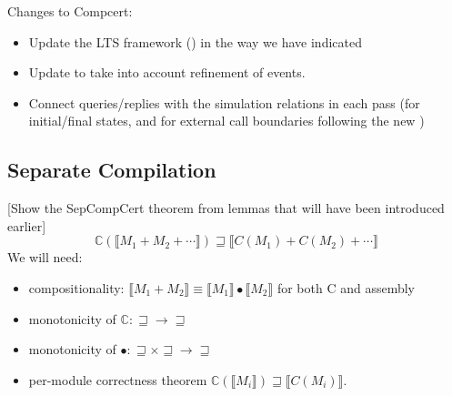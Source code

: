 Changes to Compcert:
\begin{itemize}
\item Update the LTS framework ()
  in the way we have indicated
\item Update  to take into account
  refinement of events.
\item Connect queries/replies
  with the simulation relations in each pass
  (for initial/final states, and for external call boundaries
  following the new )
\end{itemize}  


\subsection{Separate Compilation} %

[Show the SepCompCert theorem
from lemmas that will have been introduced earlier]
\[
  \mathbb{C}(\llbracket M_1 + M_2 + \cdots \rrbracket) \sqsupseteq
  \llbracket C(M_1) + C(M_2) + \cdots \rrbracket
\]
We will need:
\begin{itemize}
\item compositionality:
  $\llbracket M_1 + M_2 \rrbracket \equiv
   \llbracket M_1 \rrbracket \bullet \llbracket M_2 \rrbracket$
  for both C and assembly
\item monotonicity of $\mathbb{C} : {\sqsupseteq} \rightarrow {\sqsupseteq}$
\item monotonicity of $\bullet : {\sqsupseteq} \times {\sqsupseteq} \rightarrow {\sqsupseteq}$
\item per-module correctness theorem $\mathbb{C}(\llbracket M_i \rrbracket) \sqsupseteq \llbracket C(M_i) \rrbracket$.
\end{itemize}


